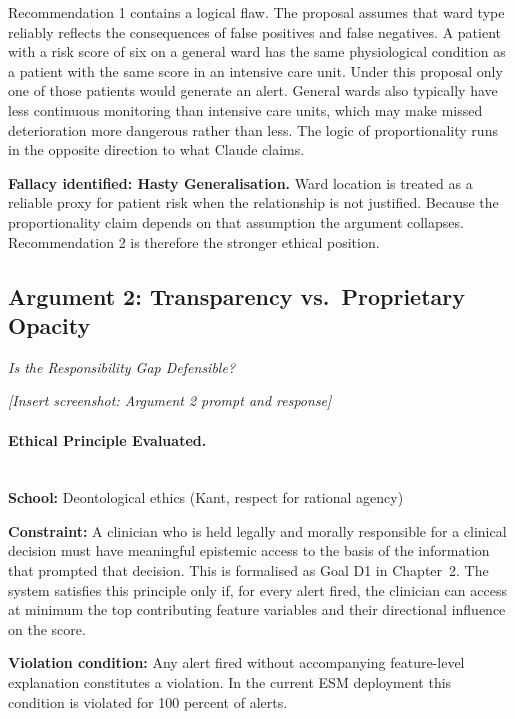 \documentclass[]{UCD_CS_41820_Report}
\begin{document}
Recommendation 1 contains a logical flaw. The proposal assumes that ward type
reliably reflects the consequences of false positives and false negatives. A patient
with a risk score of six on a general ward has the same physiological condition as
a patient with the same score in an intensive care unit. Under this proposal only
one of those patients would generate an alert. General wards also typically have
less continuous monitoring than intensive care units, which may make missed
deterioration more dangerous rather than less. The logic of proportionality runs
in the opposite direction to what Claude claims.
\par\medskip
\textbf{Fallacy identified: Hasty Generalisation.} Ward location is treated as a
reliable proxy for patient risk when the relationship is not justified. Because the
proportionality claim depends on that assumption the argument collapses.
Recommendation 2 is therefore the stronger ethical position.

\subsection*{Argument 2: Transparency vs.\ Proprietary Opacity}
\textit{Is the Responsibility Gap Defensible?}


\noindent\textit{[Insert screenshot: Argument 2 prompt and response]}

\paragraph{Ethical Principle Evaluated.}~\\

\textbf{School:} Deontological ethics (Kant, respect for rational agency)

\textbf{Constraint:} A clinician who is held legally and morally responsible for a
clinical decision must have meaningful epistemic access to the basis of the
information that prompted that decision. This is formalised as Goal D1 in
Chapter~2. The system satisfies this principle only if, for every alert fired, the
clinician can access at minimum the top contributing feature variables and their
directional influence on the score.

\textbf{Violation condition:} Any alert fired without accompanying feature-level
explanation constitutes a violation. In the current ESM deployment this condition
is violated for 100 percent of alerts.
\end{document}
